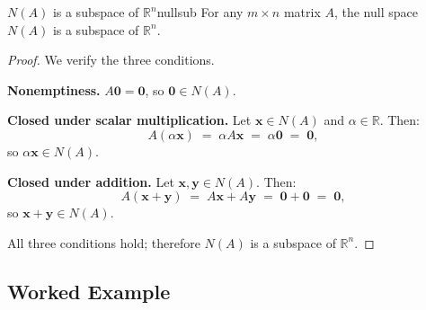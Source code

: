 \documentclass[12pt,a4paper]{article}
\newcommand{\R}{\mathbb{R}}
\newcommand{\vv}[1]{\mathbf{#1}}
\newcommand{\vzero}{\mathbf{0}}
\begin{document}
\begin{proposition}{$N(A)$ is a subspace of $\R^n$}{nullsub}
  For any $m\times n$ matrix $A$, the null space $N(A)$ is a subspace of $\R^n$.
\end{proposition}

\begin{proof}
We verify the three conditions.

\medskip
\textbf{Nonemptiness.}\quad
$A\vzero = \vzero$, so $\vzero \in N(A)$.

\medskip
\textbf{Closed under scalar multiplication.}\quad
Let $\vv{x} \in N(A)$ and $\alpha \in \R$.  Then:
\[
  A(\alpha\vv{x}) \;=\; \alpha A\vv{x} \;=\; \alpha\vzero \;=\; \vzero,
\]
so $\alpha\vv{x} \in N(A)$.

\medskip
\textbf{Closed under addition.}\quad
Let $\vv{x}, \vv{y} \in N(A)$.  Then:
\[
  A(\vv{x} + \vv{y}) \;=\; A\vv{x} + A\vv{y} \;=\; \vzero + \vzero \;=\; \vzero,
\]
so $\vv{x} + \vv{y} \in N(A)$.

\medskip
All three conditions hold; therefore $N(A)$ is a subspace of $\R^n$.
\end{proof}

\subsection{Worked Example}
\end{document}
